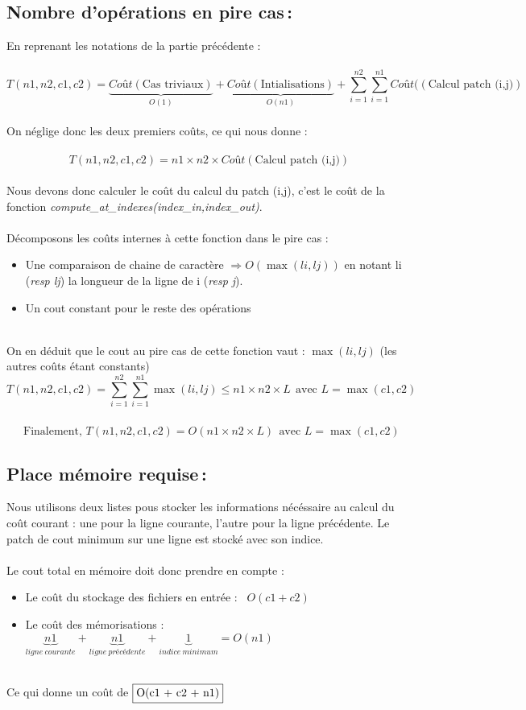 \documentclass[a4paper, 10pt, french]{article}
\begin{document}
  \subsection{Nombre  d'opérations en pire cas\,:}
    En reprenant les notations de la partie précédente : \\ \\
    $$T(n1,n2,c1,c2) = \underbrace{Coût(\text{Cas triviaux})}_{O(1)} + 
    \underbrace{Coût(\text{Intialisations})}_{O(n1)} + 
    \sum_{i=1}^{n2} \sum_{i=1}^{n1} Coût((\text{Calcul patch (i,j)})$$ \\
	On néglige donc les deux premiers coûts, ce qui nous donne : \\ \\
	$$T(n1,n2,c1,c2) = n1 \times n2 \times Coût(\text{Calcul patch (i,j)})$$
	\\ 
	Nous devons donc calculer le coût du calcul du patch (i,j), c'est le coût de la fonction \emph{compute\_at\_indexes(index_in,index_out)}.\\ \\
	Décomposons les coûts internes à cette fonction dans le pire cas :
	\begin{itemize}
	\item Une comparaison de chaine de caractère $\Rightarrow  O(\max(li,lj))$ en notant li (\textit{resp lj}) la longueur de la ligne de i (\textit{resp j}).
	\item Un cout constant pour le reste des opérations
	\end{itemize}
	~\\
	On en déduit que le cout au pire cas de cette fonction vaut : $\max(li,lj)$ (les autres coûts étant constants)
	\\ 
	$$T(n1,n2,c1,c2) = \sum_{i=1}^{n2} \sum_{i=1}^{n1} \max(li,lj) \leq n1 \times n2 \times L \ \ \text{avec } L = \max(c1,c2)$$
	\\
	 \ \ \ $\text{Finalement, } T(n1,n2,c1,c2) = O(n1 \times n2 \times L)\ \ \text{avec } L = \max(c1,c2) $
  \subsection{Place mémoire requise\,: }
	Nous utilisons deux listes pous stocker les informations nécéssaire au calcul du coût 		  courant : une pour la ligne courante, l'autre pour la ligne
    précédente. Le patch de cout minimum sur une ligne est stocké avec son indice.\\ \\
    Le cout total en mémoire doit donc prendre en compte : 
    \begin{itemize}
    \item Le coût du stockage des fichiers en entrée : \ $O(c1 + c2)$
    \item Le coût des mémorisations :  $\underbrace{n1}_{ligne\ courante} + \underbrace{n1}_{ligne\ précédente} + \underbrace{1}_{indice \ minimum} = O(n1)$
    \end{itemize}
    ~\\
    Ce qui donne un coût de $\fbox{O(c1 + c2 + n1)}$
\end{document}
